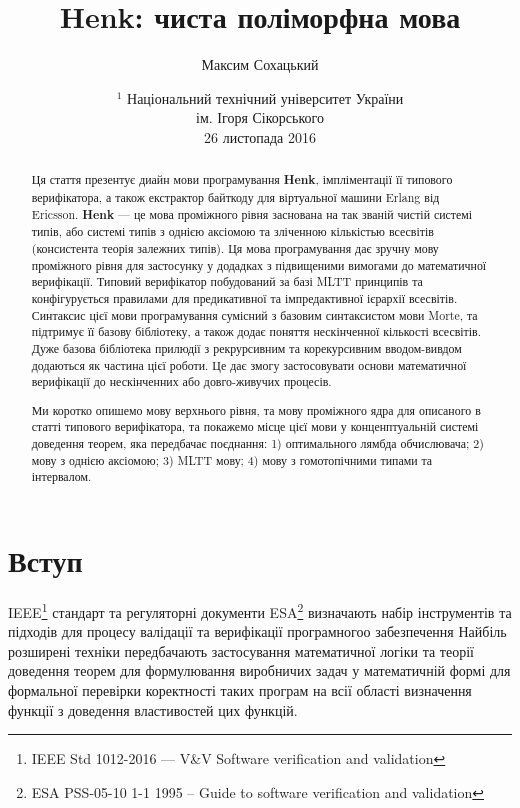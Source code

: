 \documentclass{article}
\begin{document}
\title{Henk: чиста поліморфна мова}
\author{Максим Сохацький}
\date{ \small $^1$ Національний технічний університет України \\
       ім. Ігоря Сікорського \\
       26 листопада 2016 }

\maketitle

\begin{abstract}
Ця стаття презентує диайн мови програмування \textbf{Henk}, імпліментації її типового верифікатора,
а також екстрактор байткоду для віртуальної машини Erlang від Ericsson. \textbf{Henk} — це
мова проміжного рівня заснована на так званій чистій системі типів, або системі типів з однією аксіомою та
зліченною кількістью всесвітів (консистента теорія залежних типів). Ця мова програмування дає зручну
мову проміжного рівня для застосунку у додадках з підвищеними вимогами до математичної верифікації.
Типовий верифікатор побудований за базі MLTT принципів та конфігурується правилами для предикативної та імпредактивної ієрархії всесвітів.
Синтаксис цієї мови програмування сумісний з базовим синтаксистом мови Morte, та підтримує її базову бібліотеку,
а також додає поняття нескінченної кількості всесвітів. Дуже базова бібліотека прилюдії з рекрурсивним та
корекурсивним вводом-вивдом додаються як частина цієї роботи. Це дає змогу застосовувати основи
математичної верифікації до нескінченних або довго-живучих процесів.

Ми коротко опишемо мову верхнього рівня, та мову проміжного ядра для описаного в статті типового верифікатора,
та покажемо місце цієї мови у конценптуальній системі доведення теорем, яка передбачає поєднання: 1) оптимального лямбда обчислювача;
2) мову з однією аксіомою; 3) MLTT мову; 4) мову з гомотопічними типами та інтервалом.
\end{abstract}

\newpage
\tableofcontents
\newpage

\section{Вступ}
IEEE\footnote{IEEE Std 1012-2016  --- V\&V Software verification and validation} стандарт
та регуляторні документи ESA\footnote{ESA PSS-05-10 1-1 1995 -- Guide to software verification and validation} 
визначають набір інструментів та підходів для процесу валідації та верифікації програмногоо забезпечення
Найбіль розширені техніки передбачають застосування математичної логіки та теорії доведення теорем для
формулювання виробничих задач у математичній формі для формальної перевірки коректності таких програм на всії області визначення функції
з доведення властивостей цих функцій.
\end{document}
